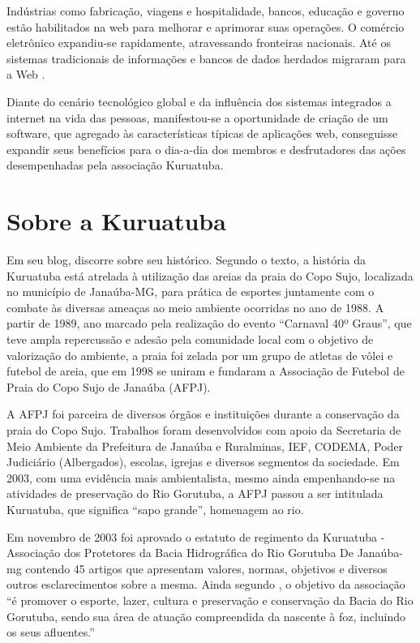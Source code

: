 \begin{citacao}
Indústrias como fabricação, viagens e hospitalidade, bancos, educação e governo estão habilitados na web para melhorar e aprimorar suas operações. O comércio eletrônico expandiu-se rapidamente, atravessando fronteiras nacionais. Até os sistemas tradicionais de informações e bancos de dados herdados migraram para a Web \cite[p. 1]{ginige2001web}.
\end{citacao}

Diante do cenário tecnológico global e da influência dos sistemas integrados a internet na vida das pessoas, manifestou-se a oportunidade de criação de um software, que agregado às características típicas de aplicações web, conseguisse expandir seus benefícios para o dia-a-dia dos membros e desfrutadores das ações desempenhadas pela associação Kuruatuba.

\hspace{2.5cm}
\section{Sobre a Kuruatuba}
\hspace{2.5cm}

Em seu blog,  discorre sobre seu histórico. Segundo o texto, a história da Kuruatuba está atrelada à utilização das areias da praia do Copo Sujo, localizada no município de Janaúba-MG, para prática de esportes juntamente com o combate às diversas ameaças ao meio ambiente ocorridas no ano de 1988. A partir de 1989, ano marcado pela realização do evento ``Carnaval 40º Graus'', que teve ampla repercussão e adesão pela comunidade local com o objetivo de valorização do ambiente, a praia foi zelada por um grupo de atletas de vôlei e futebol de areia, que em 1998 se uniram e fundaram a Associação de Futebol de Praia do Copo Sujo de Janaúba (AFPJ).

A AFPJ foi parceira de diversos órgãos e instituições durante a conservação da praia do Copo Sujo. Trabalhos foram desenvolvidos com apoio da Secretaria de Meio Ambiente da Prefeitura de Janaúba e Ruralminas, IEF, CODEMA, Poder Judiciário (Albergados), escolas, igrejas e diversos segmentos da sociedade. Em 2003, com uma evidência mais ambientalista, mesmo ainda empenhando-se na atividades de preservação do Rio Gorutuba, a AFPJ passou a ser intitulada Kuruatuba, que significa ``sapo grande'', homenagem ao rio.  

Em novembro de 2003 foi aprovado o estatuto de regimento da Kuruatuba - Associação dos Protetores da Bacia Hidrográfica do Rio Gorutuba De Janaúba-mg contendo 45 artigos que apresentam valores, normas, objetivos e diversos outros esclarecimentos sobre a mesma. Ainda segundo , o objetivo da associação ``é promover o esporte, lazer, cultura e preservação e conservação da Bacia do Rio Gorutuba, sendo sua área de atuação compreendida da nascente à foz, incluindo os seus afluentes.''

